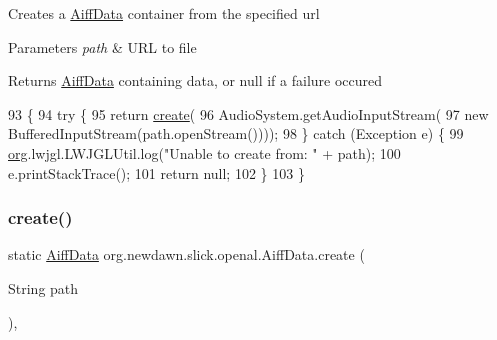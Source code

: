 Creates a \mbox{\hyperlink{classorg_1_1newdawn_1_1slick_1_1openal_1_1_aiff_data}{Aiff\+Data}} container from the specified url


\begin{DoxyParams}{Parameters}
{\em path} & U\+RL to file \\
\hline
\end{DoxyParams}
\begin{DoxyReturn}{Returns}
\mbox{\hyperlink{classorg_1_1newdawn_1_1slick_1_1openal_1_1_aiff_data}{Aiff\+Data}} containing data, or null if a failure occured 
\end{DoxyReturn}

\begin{DoxyCode}
93                                             \{
94         \textcolor{keywordflow}{try} \{
95             \textcolor{keywordflow}{return} \mbox{\hyperlink{classorg_1_1newdawn_1_1slick_1_1openal_1_1_aiff_data_a0ebd8831d179c446e18751819f9045c5}{create}}(
96                 AudioSystem.getAudioInputStream(
97                     \textcolor{keyword}{new} BufferedInputStream(path.openStream())));
98         \} \textcolor{keywordflow}{catch} (Exception e) \{
99             \mbox{\hyperlink{namespaceorg}{org}}.lwjgl.LWJGLUtil.log(\textcolor{stringliteral}{"Unable to create from: "} + path);
100             e.printStackTrace();
101             \textcolor{keywordflow}{return} null;
102         \}       
103     \}
\end{DoxyCode}
\mbox{\label{classorg_1_1newdawn_1_1slick_1_1openal_1_1_aiff_data_a236d4055671a1426b2bdf9908f83f209}} 
\subsubsection{\texorpdfstring{create()}{create()}\hspace{0.1cm}{\footnotesize\ttfamily [2/6]}}
{\footnotesize\ttfamily static \mbox{\hyperlink{classorg_1_1newdawn_1_1slick_1_1openal_1_1_aiff_data}{Aiff\+Data}} org.\+newdawn.\+slick.\+openal.\+Aiff\+Data.\+create (\begin{DoxyParamCaption}\item[{String}]{path }\end{DoxyParamCaption})\hspace{0.3cm}{\ttfamily [inline]}, {\ttfamily [static]}}

